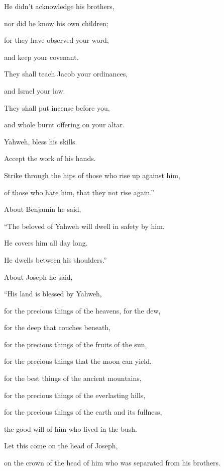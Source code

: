 {\par }{\QB He didn’t acknowledge his brothers,
\par }{\QB nor did he know his own children;
\par }{\Q for they have observed your word,
\par }{\QB and keep your covenant.
\par }{\Q {}They shall teach Jacob your ordinances,
\par }{\QB and Israel your law.
\par }{\Q They shall put incense before you,
\par }{\QB and whole burnt offering on your altar.
\par }{\Q {}Yahweh, bless his skills.
\par }{\QB Accept the work of his hands.
\par }{\Q Strike through the hips of those who rise up against him,
\par }{\QB of those who hate him, that they not rise again.”
\par }{\PP {}About Benjamin he said,
\par }{\Q “The beloved of Yahweh will dwell in safety by him.
\par }{\QB He covers him all day long.
\par }{\QB He dwells between his shoulders.”
\par }{\PP {}About Joseph he said,
\par }{\Q “His land is blessed by Yahweh,
\par }{\QB for the precious things of the heavens, for the dew,
\par }{\QB for the deep that couches beneath,
\par }{\Q {}for the precious things of the fruits of the sun,
\par }{\QB for the precious things that the moon can yield,
\par }{\Q {}for the best things of the ancient mountains,
\par }{\QB for the precious things of the everlasting hills,
\par }{\Q {}for the precious things of the earth and its fullness,
\par }{\QB the good will of him who lived in the bush.
\par }{\Q Let this come on the head of Joseph,
\par }{\QB on the crown of the head of him who was separated from his brothers.
}
